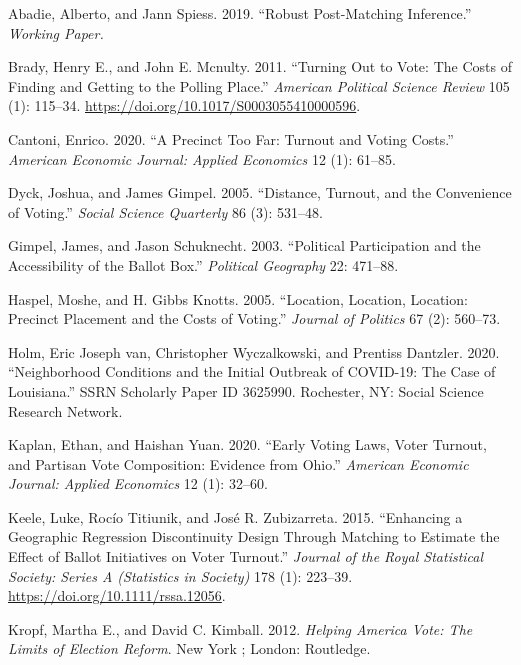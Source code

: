 \documentclass[
  12pt,
]{article}
\newlength{\cslhangindent}
\newenvironment{cslreferences}%
  {\setlength{\parindent}{0pt}%
  \everypar{\setlength{\hangindent}{\cslhangindent}}\ignorespaces}%
  {\par}
\begin{document}
\hypertarget{refs}{}
\begin{cslreferences}
\leavevmode\hypertarget{ref-Abadie2019}{}%
Abadie, Alberto, and Jann Spiess. 2019. ``Robust Post-Matching Inference.'' \emph{Working Paper.}

\leavevmode\hypertarget{ref-Brady2011}{}%
Brady, Henry E., and John E. Mcnulty. 2011. ``Turning Out to Vote: The Costs of Finding and Getting to the Polling Place.'' \emph{American Political Science Review} 105 (1): 115--34. \url{https://doi.org/10.1017/S0003055410000596}.

\leavevmode\hypertarget{ref-Cantoni2020}{}%
Cantoni, Enrico. 2020. ``A Precinct Too Far: Turnout and Voting Costs.'' \emph{American Economic Journal: Applied Economics} 12 (1): 61--85.

\leavevmode\hypertarget{ref-Dyck2005}{}%
Dyck, Joshua, and James Gimpel. 2005. ``Distance, Turnout, and the Convenience of Voting.'' \emph{Social Science Quarterly} 86 (3): 531--48.

\leavevmode\hypertarget{ref-Gimpel2003}{}%
Gimpel, James, and Jason Schuknecht. 2003. ``Political Participation and the Accessibility of the Ballot Box.'' \emph{Political Geography} 22: 471--88.

\leavevmode\hypertarget{ref-Haspel2005}{}%
Haspel, Moshe, and H. Gibbs Knotts. 2005. ``Location, Location, Location: Precinct Placement and the Costs of Voting.'' \emph{Journal of Politics} 67 (2): 560--73.

\leavevmode\hypertarget{ref-vanHolm2020}{}%
Holm, Eric Joseph van, Christopher Wyczalkowski, and Prentiss Dantzler. 2020. ``Neighborhood Conditions and the Initial Outbreak of COVID-19: The Case of Louisiana.'' SSRN Scholarly Paper ID 3625990. Rochester, NY: Social Science Research Network.

\leavevmode\hypertarget{ref-Kaplan2020}{}%
Kaplan, Ethan, and Haishan Yuan. 2020. ``Early Voting Laws, Voter Turnout, and Partisan Vote Composition: Evidence from Ohio.'' \emph{American Economic Journal: Applied Economics} 12 (1): 32--60.

\leavevmode\hypertarget{ref-Keele2015}{}%
Keele, Luke, Rocío Titiunik, and José R. Zubizarreta. 2015. ``Enhancing a Geographic Regression Discontinuity Design Through Matching to Estimate the Effect of Ballot Initiatives on Voter Turnout.'' \emph{Journal of the Royal Statistical Society: Series A (Statistics in Society)} 178 (1): 223--39. \url{https://doi.org/10.1111/rssa.12056}.

\leavevmode\hypertarget{ref-Kropf2012}{}%
Kropf, Martha E., and David C. Kimball. 2012. \emph{Helping America Vote: The Limits of Election Reform}. New York ; London: Routledge.


\end{cslreferences}
\end{document}
